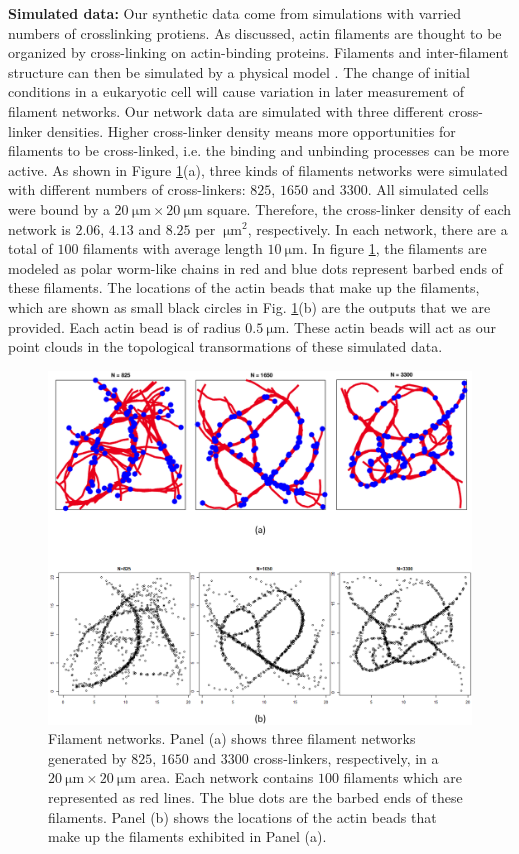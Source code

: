 \documentclass[10pt]{article}
\begin{document}
\textbf{Simulated data:}
Our synthetic data come from simulations with varried numbers of crosslinking protiens. As discussed, actin filaments are thought to be organized by cross-linking on actin-binding proteins. Filaments and inter-filament structure can then be simulated by a physical model \cite{freedman2017versatile,freedman2018nonequilibrium}. The change of initial conditions in a eukaryotic cell will cause variation in later measurement of filament networks. Our network data are simulated with three different cross-linker densities. Higher cross-linker density means more opportunities for filaments to be cross-linked, i.e. the binding and unbinding processes can be more active. As shown in Figure \ref{fig:rawdata}(a), three kinds of filaments networks were simulated with different numbers of cross-linkers:  $825$, $1650$ and $3300$. All simulated cells were bound by a $\SI{20}{\micro\metre} \times \SI{20}{\micro\metre}$ square. Therefore, the cross-linker density of each network is $2.06$, $4.13$ and $8.25$ per $\SI{}{\micro\metre}^2$, respectively. In each network, there are a total of $100$ filaments with average length $\SI{10}{\micro\metre}$. In figure \ref{fig:rawdata}, the filaments are modeled as polar worm-like chains in red and blue dots represent barbed ends of these filaments. The locations of the actin beads that make up the filaments, which are shown as small black circles in Fig. \ref{fig:rawdata}(b) are the outputs that we are provided. Each actin bead is of radius $\SI{0.5}{\micro\metre}$. These actin beads will act as our point clouds in the topological transormations of these simulated data.

\begin{figure}[H]
	\begin{center}
		\includegraphics[width=.8\textwidth]{rawdata.png}
	\end{center}
	\caption{Filament networks. Panel (a) shows three filament networks generated by $825$, $1650$ and $3300$ cross-linkers, respectively, in a $\SI{20}{\micro\metre} \times \SI{20}{\micro\metre}$ area. Each network contains $100$ filaments which are represented as red lines. The blue dots are the barbed ends of these filaments. Panel (b) shows the locations of the actin beads that make up the filaments exhibited in Panel (a).}
	\label{fig:rawdata}
\end{figure}
\end{document}
